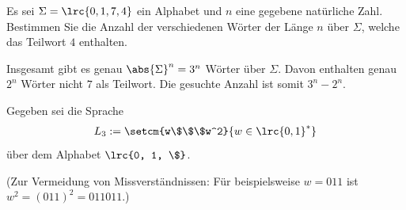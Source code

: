 \begin{questions}

	Es sei $\Sigma = \lrc{0, 1, 7, 4}$ ein Alphabet und $n$ eine gegebene natürliche Zahl. Bestimmen Sie die Anzahl der verschiedenen Wörter der Länge $n$ über $\Sigma$, welche das Teilwort $4$ enthalten.
	\begin{solution}
		Insgesamt gibt es genau $\abs{\Sigma}^n = 3^n$ Wörter über $\Sigma$. Davon enthalten genau $2^n$ Wörter nicht $7$ als Teilwort. Die gesuchte Anzahl ist somit $3^n - 2^n$.
	\end{solution}
	\droptotalpoints
	\clearpage


	Gegeben sei die Sprache
	\begin{align*}
		L_3 := \setcm{w\$\$\$w^2}{w\in\lrc{0, 1}^*}
	\end{align*}
	über dem Alphabet $\lrc{0, 1, \$}$.

	(Zur Vermeidung von Missverständnissen: Für beispielsweise $w = 011$ ist $w^2 = (011)^2 = 011011$.)

\end{questions}
